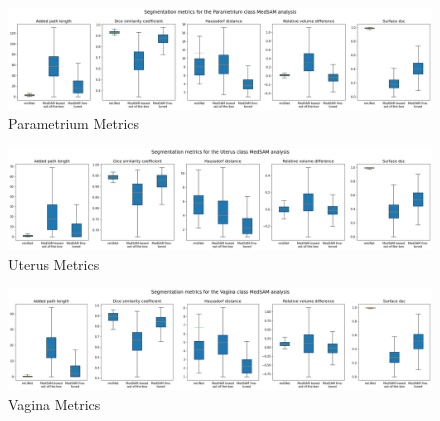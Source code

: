 \documentclass[12pt,twoside]{report}
\begin{document}
\begin{landscape}
  \begin{figure}[H]
    \centering
    \includegraphics[width=\linewidth]{../../research/source/code/data/metrics/metricsparametrium_1_combinednotable_MedSAM_analysis.png}
    \caption{Parametrium Metrics}\label{fig:medsam-metrics-parametrium}
  \end{figure}

  \begin{figure}[H]
    \centering
    \includegraphics[width=\linewidth]{../../research/source/code/data/metrics/metricsuterus_1_combinednotable_MedSAM_analysis.png}
    \caption{Uterus Metrics}\label{fig:medsam-metrics-uterus}
  \end{figure}

  \begin{figure}[H]
    \centering
    \includegraphics[width=\linewidth]{../../research/source/code/data/metrics/metricsvagina_1_combinednotable_MedSAM_analysis.png}
    \caption{Vagina Metrics}\label{fig:medsam-metrics-vagina}
  \end{figure}

\end{landscape}



\end{document}
